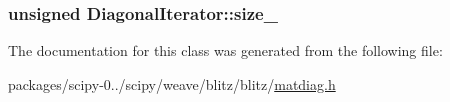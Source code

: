 \subsubsection[{size\+\_\+}]{\setlength{\rightskip}{0pt plus 5cm}unsigned Diagonal\+Iterator\+::size\+\_\+\hspace{0.3cm}{\ttfamily [protected]}}\label{classDiagonalIterator_a449e656511e2d61e50d878debe597300}


The documentation for this class was generated from the following file\+:\begin{DoxyCompactItemize}
\item 
packages/scipy-\/0../scipy/weave/blitz/blitz/\hyperlink{matdiag_8h}{matdiag.\+h}\end{DoxyCompactItemize}
